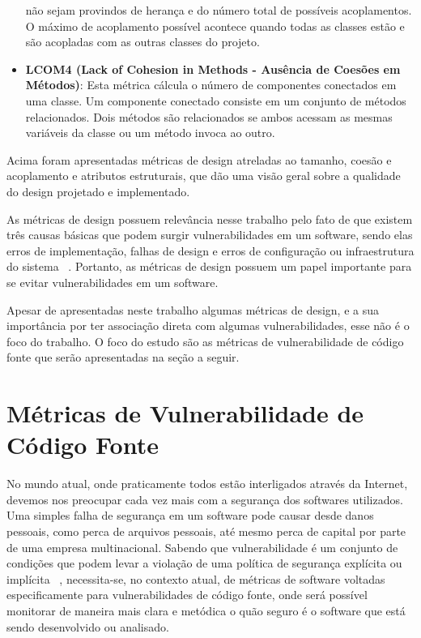 \begin{itemize}
    não sejam provindos de herança e do número total de possíveis acoplamentos. O máximo de acoplamento possível acontece 
    quando todas as classes estão e são acopladas com as outras classes do projeto.
  \item \textbf{LCOM4 (Lack of Cohesion in Methods - Ausência de Coesões em Métodos)}: Esta métrica cálcula o número de 
    componentes conectados em uma classe. Um componente conectado consiste em um conjunto de métodos relacionados. Dois
    métodos são relacionados se ambos acessam as mesmas variáveis da classe ou um método invoca ao outro.
\end{itemize}

Acima foram apresentadas métricas de design atreladas ao tamanho, coesão e acoplamento e atributos estruturais, que dão uma
visão geral sobre a qualidade do design projetado e implementado.

As métricas de design possuem relevância nesse trabalho pelo fato de que existem três causas básicas que podem surgir 
vulnerabilidades em um software, sendo elas erros de implementação, falhas de design e erros de configuração ou infraestrutura
do sistema ~\cite{malerba2010}. Portanto, as métricas de design possuem um papel importante para se evitar vulnerabilidades 
em um software.

Apesar de apresentadas neste trabalho algumas métricas de design, e a sua importância por ter associação direta com algumas 
vulnerabilidades, esse não é o foco do trabalho. O foco do estudo são as métricas de vulnerabilidade de código fonte que serão 
apresentadas na seção a seguir.

\section{Métricas de Vulnerabilidade de Código Fonte}

No mundo atual, onde praticamente todos estão interligados através da Internet, devemos nos preocupar cada vez mais com a 
segurança dos softwares utilizados. Uma simples falha de segurança em um software pode causar desde danos pessoais, como perca 
de arquivos pessoais, até mesmo perca de capital por parte de uma empresa multinacional. Sabendo que vulnerabilidade é um 
conjunto de condições que podem levar a violação de uma política de segurança explícita ou implícita 
~\cite{seacord&householder2005}, necessita-se, no contexto atual, de métricas de software voltadas especificamente para 
vulnerabilidades de código fonte, onde será possível monitorar de maneira mais clara e metódica o quão seguro é o software que 
está sendo desenvolvido ou analisado.

